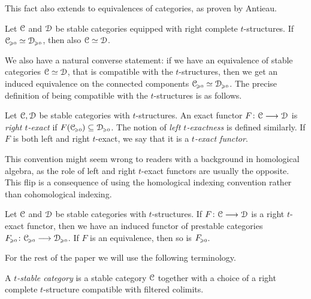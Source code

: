 This fact also extends to equivalences of categories, as proven by Antieau. 

\begin{lemma}
    \label{ch3:lm:if-prestable-equiv-then-stable-equiv}
    Let $\EuScript{C}$ and $\EuScript{D}$ be stable categories equipped with right complete $t$-structures. If $\EuScript{C}_{\hspace{-1pt}\scriptscriptstyle\geqslant 0}\simeq \EuScript{D}_{\hspace{-1pt}\scriptscriptstyle\geqslant 0}$, then also $\EuScript{C}\simeq \EuScript{D}$. 
\end{lemma}

We also have a natural converse statement: if we have an equivalence of stable categories $\EuScript{C}\simeq \EuScript{D}$, that is compatible with the $t$-structures, then we get an induced equivalence on the connected components $\EuScript{C}_{\hspace{-1pt}\scriptscriptstyle\geqslant 0}\simeq \EuScript{D}_{\hspace{-1pt}\scriptscriptstyle\geqslant 0}$. The precise definition of being compatible with the $t$-structures is as follows. 

\begin{definition}
    Let $\EuScript{C}, \EuScript{D}$ be stable categories with $t$-structures. An exact functor $F\colon\EuScript{C}\longrightarrow\EuScript{D}$ is \emph{right $t$-exact} if $F(\EuScript{C}_{\hspace{-1pt}\scriptscriptstyle\geqslant 0})\subseteq \EuScript{D}_{\hspace{-1pt}\scriptscriptstyle\geqslant 0}$. The notion of \emph{left $t$-exactness} is defined similarly. If $F$ is both left and right $t$-exact, we say that it is a \emph{$t$-exact functor}. 
\end{definition}

\begin{remark}
    This convention might seem wrong to readers with a background in homological algebra, as the role of left and right $t$-exact functors are usually the opposite. This flip is a consequence of using the homological indexing convention rather than cohomological indexing. 
\end{remark}

\begin{lemma}
    Let $\EuScript{C}$ and $\EuScript{D}$ be stable categories with $t$-structures. If $F\colon\EuScript{C}\longrightarrow\EuScript{D}$ is a right $t$-exact functor, then we have an induced functor of prestable categories $F_{\hspace{-1pt}\scriptscriptstyle\geqslant 0}\colon\EuScript{C}_{\hspace{-1pt}\scriptscriptstyle\geqslant 0}\longrightarrow\EuScript{D}_{\hspace{-1pt}\scriptscriptstyle\geqslant 0}$. If $F$ is an equivalence, then so is $F_{\hspace{-1pt}\scriptscriptstyle\geqslant 0}$. 
\end{lemma}

For the rest of the paper we will use the following terminology. 

\begin{definition}
    A \emph{$t$-stable category} is a stable category $\EuScript{C}$ together with a choice of a right complete $t$-structure compatible with filtered colimits. 
\end{definition}

